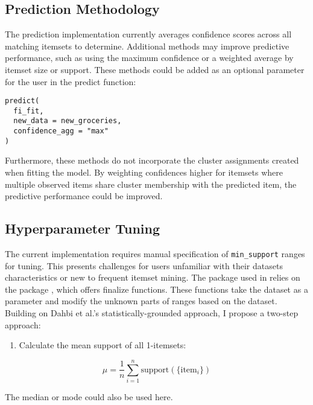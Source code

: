 \documentclass[
  article]{jss}
\providecommand{\tightlist}{%
  \setlength{\itemsep}{0pt}\setlength{\parskip}{0pt}}
\begin{document}
\subsection{Prediction Methodology}\label{prediction-methodology}

The prediction implementation currently averages confidence scores
across all matching itemsets to determine. Additional methods may
improve predictive performance, such as using the maximum confidence
\citep{mobasher_effective_2001} or a weighted average by itemset size or
support. These methods could be added as an optional parameter for the
user in the predict function:

\begin{verbatim}
predict(
  fi_fit,
  new_data = new_groceries,
  confidence_agg = "max"
)
\end{verbatim}

Furthermore, these methods do not incorporate the cluster assignments
created when fitting the model. By weighting confidences higher for
itemsets where multiple observed items share cluster membership with the
predicted item, the predictive performance could be improved.

\subsection{Hyperparameter Tuning}\label{hyperparameter-tuning-1}

The current implementation requires manual specification of
\texttt{min\_support} ranges for tuning. This presents challenges for
users unfamiliar with their datasets characteristics or new to frequent
itemset mining. The  package used in  relies on
the  package \citep{kuhn_dials_2024}, which offers finalize
functions. These functions take the dataset as a parameter and modify
the unknown parts of ranges based on the dataset. Building on Dahbi et
al.'s \citeyearpar{dahbi_finding_2021} statistically-grounded approach,
I propose a two-step approach:

\begin{enumerate}
\def\labelenumi{\arabic{enumi}.}
\tightlist
\item
  Calculate the mean support of all 1-itemsets:
\end{enumerate}

\[
\mu = \frac{1}{n}\sum^n_{i=1}{\text{support}(\{\text{item}_i\})}
\]

The median or mode could also be used here.
\end{document}
